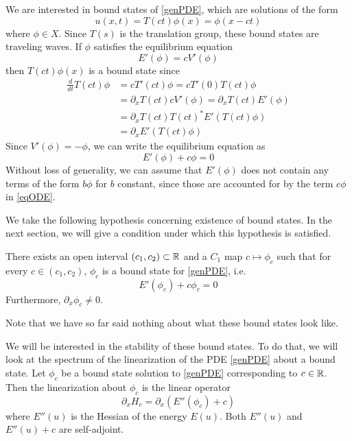 \documentclass[thesis.tex]{subfiles}
\begin{document}
We are interested in bound states of \eqref{genPDE}, which are solutions of the form
\begin{equation}
u(x, t) = T(ct)\phi(x) = \phi(x - ct)
\end{equation}
where $\phi \in X$. Since $T(s)$ is the translation group, these bound states are traveling waves. If $\phi$ satisfies the equilibrium equation
\begin{equation}\label{eqODE1}
E'(\phi) = c V'(\phi)
\end{equation}
then $T(ct)\phi(x)$ is a bound state since 
\begin{align*}
\frac{d}{dt}T(ct)\phi &= c T'(ct)\phi 
= c T'(0)T(ct)\phi \\
&= \partial_x T(ct) c V'(\phi)
= \partial_x T(ct) E'(\phi) \\
&= \partial_x T(ct) T(ct)^* E'(T(ct)\phi) \\
&= \partial_x E'(T(ct)\phi) 
\end{align*}
Since $V'(\phi) = -\phi$, we can write the equilibrium equation as
\begin{equation}\label{eqODE}
E'(\phi) + c \phi = 0 
\end{equation}
Without loss of generality, we can assume that $E'(\phi)$ does not contain any terms of the form $b\phi$ for $b$ constant, since those are accounted for by the term $c \phi$ in \eqref{eqODE}.

We take the following hypothesis concerning existence of bound states. In the next section, we will give a condition under which this hypothesis is satisfied. 
\begin{hypothesis}\label{cintervalhyp}
There exists an open interval $(c_1, c_2) \subset {\mathbb R}$ and a $C_1$ map $c \mapsto \phi_c$ such that for every $c \in (c_1, c_2)$, $\phi_c$ is a bound state for \eqref{genPDE}, i.e. 
\[
E'(\phi_c) + c \phi_c = 0 
\]
Furthermore, $\partial_x \phi_c \neq 0$.
\end{hypothesis}
Note that we have so far said nothing about what these bound states look like.

We will be interested in the stability of these bound states. To do that, we will look at the spectrum of the linearization of the PDE \eqref{genPDE} about a bound state. Let $\phi_c$ be a bound state solution to \eqref{genPDE} corresponding to $c \in {\mathbb R}$. Then the linearization about $\phi_c$ is the linear operator
\begin{equation}\label{PDElinearization}
\partial_x H_c = 
\partial_x (E''(\phi_c) + c )
\end{equation}
where $E''(u)$ is the Hessian of the energy $E(u)$. Both $E''(u)$ and $E''(u) + c$ are self-adjoint. 
\end{document}
